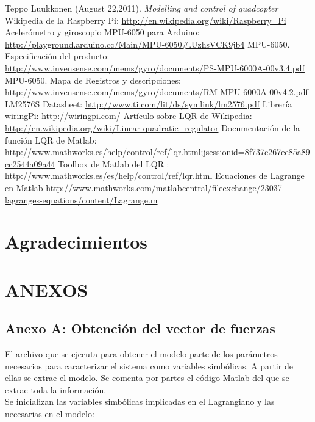 \documentclass[twoside,11pt]{book}
\begin{document}
\begin{thebibliography}{99}
 Teppo Luukkonen (August 22,2011). \textit{Modelling and control of quadcopter}
 Wikipedia de la Raspberry Pi: \url{http://en.wikipedia.org/wiki/Raspberry_Pi}
 Acelerómetro y giroscopio MPU-6050 para Arduino: \url{http://playground.arduino.cc/Main/MPU-6050#.UzhsVCK9jb4}
 MPU-6050. Especificación del producto: \url{http://www.invensense.com/mems/gyro/documents/PS-MPU-6000A-00v3.4.pdf}
 MPU-6050. Mapa de Registros y descripciones: \url{http://www.invensense.com/mems/gyro/documents/RM-MPU-6000A-00v4.2.pdf}
 LM2576S Datasheet: \url{http://www.ti.com/lit/ds/symlink/lm2576.pdf}
 Librería wiringPi: \url{http://wiringpi.com/}
 Artículo sobre LQR de Wikipedia: \url{http://en.wikipedia.org/wiki/Linear-quadratic_regulator}
 Documentación de la función LQR de Matlab: \url{http://www.mathworks.es/help/control/ref/lqr.html;jsessionid=8f737c267ee85a89cc2544a09a44}
 Toolbox de Matlab del LQR : \url{http://www.mathworks.es/es/help/control/ref/lqr.html}
 Ecuaciones de Lagrange en Matlab \url{http://www.mathworks.com/matlabcentral/fileexchange/23037-lagranges-equations/content/Lagrange.m}
\end{thebibliography}{}

\newpage

\chapter*{Agradecimientos}

\newpage

\chapter*{ANEXOS}
\section*{Anexo A: Obtención del vector de fuerzas}

El archivo que se ejecuta para obtener el modelo parte de los parámetros necesarios para caracterizar el sistema como variables simbólicas. A partir de ellas se extrae el modelo. Se comenta por partes el código Matlab del que se extrae toda la información. \\

Se inicializan las variables simbólicas implicadas en el Lagrangiano y las necesarias en el modelo:
\end{document}
